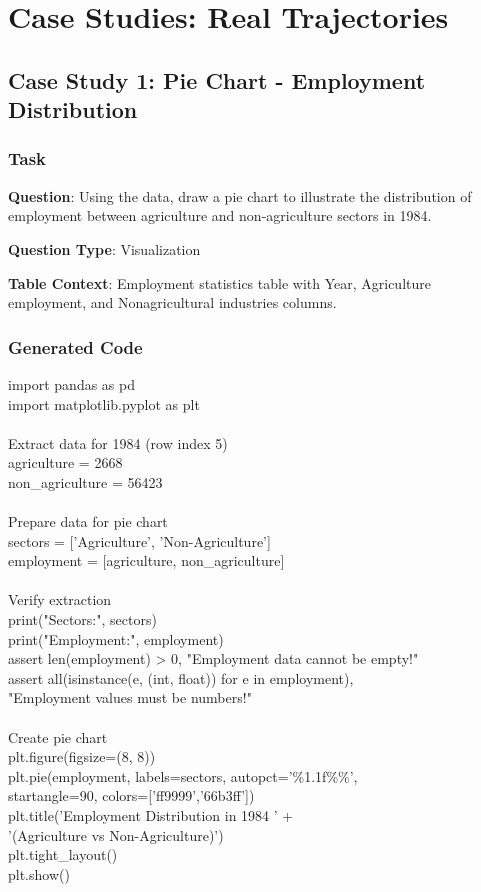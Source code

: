 \section{Case Studies: Real Trajectories}
\subsection{Case Study 1: Pie Chart - Employment Distribution}

\subsubsection{Task}

\textbf{Question}: Using the data, draw a pie chart to illustrate the distribution of employment between agriculture and non-agriculture sectors in 1984.

\textbf{Question Type}: Visualization

\textbf{Table Context}: Employment statistics table with Year, Agriculture employment, and Nonagricultural industries columns.

\subsubsection{Generated Code}

import pandas as pd \\
import matplotlib.pyplot as plt \\
\\
 Extract data for 1984 (row index 5) \\
agriculture = 2668 \\
non\_agriculture = 56423 \\
\\
 Prepare data for pie chart \\
sectors = ['Agriculture', 'Non-Agriculture'] \\
employment = [agriculture, non\_agriculture] \\
\\
 Verify extraction \\
print("Sectors:", sectors) \\
print("Employment:", employment) \\
assert len(employment) > 0, "Employment data cannot be empty!" \\
assert all(isinstance(e, (int, float)) for e in employment), \ \\
      "Employment values must be numbers!" \\
\\
 Create pie chart \\
plt.figure(figsize=(8, 8)) \\
plt.pie(employment, labels=sectors, autopct='\%1.1f\%\%', \\
        startangle=90, colors=['ff9999','66b3ff']) \\
plt.title('Employment Distribution in 1984 ' + \\
          '(Agriculture vs Non-Agriculture)') \\
plt.tight\_layout() \\
plt.show() \\
\\

